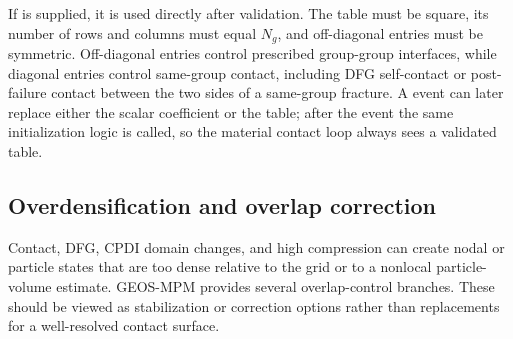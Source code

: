 If  is supplied, it is used directly after validation.  The table must be square, its number of rows and columns must equal $N_g$, and off-diagonal entries must be symmetric.  Off-diagonal entries control prescribed group-group interfaces, while diagonal entries control same-group contact, including DFG self-contact or post-failure contact between the two sides of a same-group fracture.  A  event can later replace either the scalar coefficient or the table; after the event the same initialization logic is called, so the material contact loop always sees a validated table.

\subsection{Overdensification and overlap correction}
\label{subsec:overdensification-overlap-correction}

Contact, DFG, CPDI domain changes, and high compression can create nodal or particle states that are too dense relative to the grid or to a nonlocal particle-volume estimate.  GEOS-MPM provides several overlap-control branches.  These should be viewed as stabilization or correction options rather than replacements for a well-resolved contact surface.

